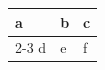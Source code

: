 \begin{tabular}{lll}
  \toprule
  a & b & c \\
  \cmidrule(lr){2-3}
  d & e & f \\
  \bottomrule
\end{tabular}

